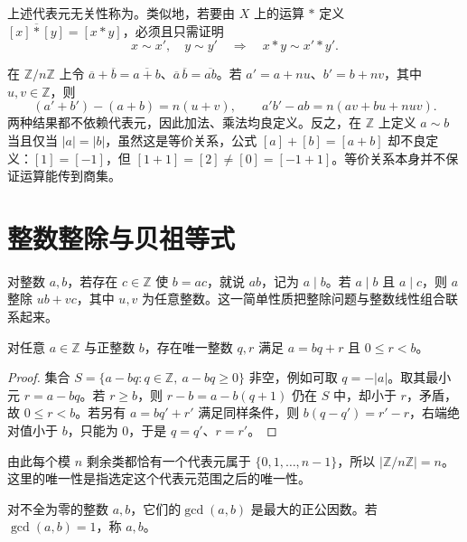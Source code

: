 \documentclass[UTF8,12pt,a4paper,fontset=fandol]{ctexbook}
\begin{document}
上述代表元无关性称为。类似地，若要由 $X$ 上的运算 $*$ 定义 $[x]\mathbin{\overline *}[y]=[x*y]$，必须且只需证明
\begin{equation}\label{eq:operation-descends}
  x\sim x',\quad y\sim y'\quad\Longrightarrow\quad x*y\sim x'*y'.
\end{equation}

\begin{example}[剩余类运算的良定义性]\label{ex:residue-operations}
在 $\mathbb Z/n\mathbb Z$ 上令 $\overline a+\overline b=\overline{a+b}$、$\overline a\,\overline b=\overline{ab}$。若 $a'=a+nu$、$b'=b+nv$，其中 $u,v\in\mathbb Z$，则
\[
  (a'+b')-(a+b)=n(u+v),\qquad
  a'b'-ab=n(av+bu+nuv).
\]
两种结果都不依赖代表元，因此加法、乘法均良定义。反之，在 $\mathbb Z$ 上定义 $a\sim b$ 当且仅当 $|a|=|b|$，虽然这是等价关系，公式 $[a]+[b]=[a+b]$ 却不良定义：$[1]=[-1]$，但 $[1+1]=[2]\ne[0]=[-1+1]$。等价关系本身并不保证运算能传到商集。
\end{example}

\section{整数整除与贝祖等式}\label{sec:integer-divisibility}

对整数 $a,b$，若存在 $c\in\mathbb Z$ 使 $b=ac$，就说 $a$$b$，记为 $a\mid b$。若 $a\mid b$ 且 $a\mid c$，则 $a$ 整除 $ub+vc$，其中 $u,v$ 为任意整数。这一简单性质把整除问题与整数线性组合联系起来。

\begin{theorem}[带余除法]\label{thm:integer-division}
对任意 $a\in\mathbb Z$ 与正整数 $b$，存在唯一整数 $q,r$ 满足 $a=bq+r$ 且 $0\leq r<b$。
\end{theorem}
\begin{proof}
集合 $S=\{a-bq:q\in\mathbb Z,\ a-bq\geq0\}$ 非空，例如可取 $q=-|a|$。取其最小元 $r=a-bq$。若 $r\geq b$，则 $r-b=a-b(q+1)$ 仍在 $S$ 中，却小于 $r$，矛盾，故 $0\leq r<b$。若另有 $a=bq'+r'$ 满足同样条件，则 $b(q-q')=r'-r$，右端绝对值小于 $b$，只能为 $0$，于是 $q=q'$、$r=r'$。
\end{proof}

由此每个模 $n$ 剩余类都恰有一个代表元属于 $\{0,1,\ldots,n-1\}$，所以 $|\mathbb Z/n\mathbb Z|=n$。这里的唯一性是指选定这个代表元范围之后的唯一性。

\begin{definition}[最大公因数与互素]
对不全为零的整数 $a,b$，它们的$\gcd(a,b)$ 是最大的正公因数。若 $\gcd(a,b)=1$，称 $a,b$。
\end{definition}
\end{document}
